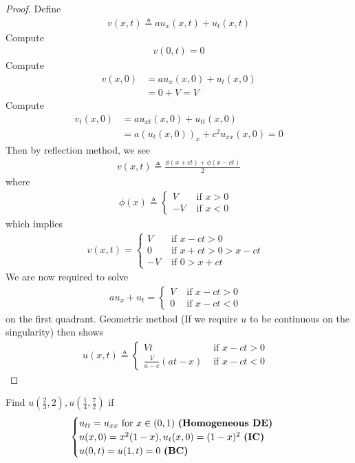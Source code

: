 \documentclass{report}
\begin{document}
\begin{proof}
Define 
\begin{align*}
v(x,t)\triangleq au_x(x,t)+u_t(x,t)
\end{align*}
Compute 
\begin{align*}
v(0,t)=0
\end{align*}
Compute 
\begin{align*}
v(x,0)&=au_x(x,0)+u_t(x,0) \\
&=0+V=V
\end{align*}
Compute 
\begin{align*}
v_t(x,0)&=au_{xt}(x,0)+u_{tt}(x,0)\\
&=a(u_{t}(x,0))_x+c^2u_{xx}(x,0)=0
\end{align*}
Then by reflection method, we see 
\begin{align*}
v(x,t)\triangleq \frac{\phi (x+ct)+\phi (x-ct)}{2}
\end{align*}
where 
\begin{align*}
\phi (x)\triangleq \begin{cases}
  V& \text{ if $x>0$ }\\
  -V& \text{ if $x<0$ }
\end{cases}
\end{align*}
which implies 
\begin{align*}
v(x,t)=\begin{cases}
  V& \text{ if $x-ct>0$ }\\
  0& \text{ if $x+ct>0>x-ct$ }\\
  -V& \text{ if $0>x+ct$ }
\end{cases}
\end{align*}
We are now required to solve 
\begin{align*}
au_x+u_t=\begin{cases}
  V& \text{ if $x-ct>0$ }\\
  0& \text{ if $x-ct<0$ }
\end{cases}
\end{align*}
on the first quadrant. Geometric method (If we require $u$ to be continuous on the singularity) then shows 
\begin{align*}
u(x,t)\triangleq \begin{cases}
  Vt& \text{ if $x-ct>0$ }\\
  \frac{V}{a-c}(at-x)& \text{ if $x-ct<0$ }
\end{cases}
\end{align*}
\end{proof}
\begin{question}{}{}
Find $u(\frac{2}{3},2),u(\frac{1}{4},\frac{7}{2})$ if
\begin{align*}
\begin{cases}
  u_{tt}=u_{xx}\text{ for }x\in (0,1)\text{ \textbf{(Homogeneous DE)} }\\
  u(x,0)=x^2(1-x),u_t(x,0)=(1-x)^2\text{ \textbf{(IC)} }\\
  u(0,t)=u(1,t)=0\text{ \textbf{(BC)} }
\end{cases}
\end{align*}
\end{question}
\end{document}
